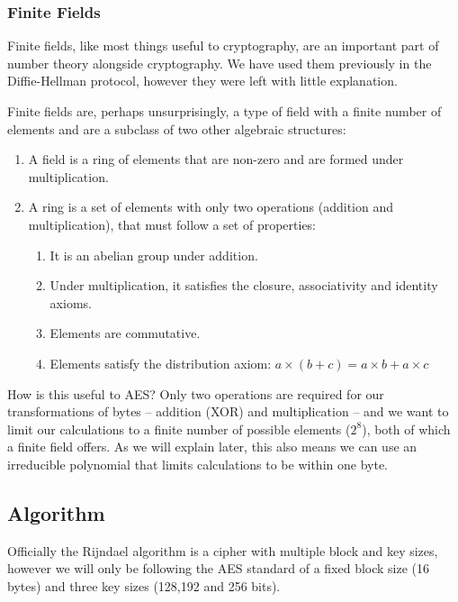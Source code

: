     \subsubsection{Finite Fields}
    
    Finite fields, like most things useful to cryptography, are an important part of number theory alongside cryptography. We have used them previously in the Diffie-Hellman protocol, however they were left with little explanation. 
    
    Finite fields are, perhaps unsurprisingly, a type of field with a finite number of elements and are a subclass of two other algebraic structures:
    
    \begin{enumerate}
      \item A field is a ring of elements that are non-zero and are formed under multiplication.
      \item A ring is a set of elements with only two operations (addition and multiplication), that must follow a set of properties:
      \begin{enumerate}
        \item It is an abelian group under addition.
        \item Under multiplication, it satisfies the closure, associativity and identity axioms.
        \item Elements are commutative.
        \item Elements satisfy the distribution axiom: $a \times (b + c) = a \times b + a \times c$
      \end{enumerate}
    \end{enumerate}
    
    How is this useful to AES? Only two operations are required for our transformations of bytes -- addition (XOR) and multiplication -- and we want to limit our calculations to a finite number of possible elements ($2^8$), both of which a finite field offers. As we will explain later, this also means we can use an irreducible polynomial that limits calculations to be within one byte.
    
  \subsection{Algorithm}
  \label{subsec:aes_algo}
    
    Officially the Rijndael algorithm is a cipher with multiple block and key sizes, however we will only be following the AES standard of a fixed block size (16 bytes) and three key sizes (128,192 and 256 bits).
    
